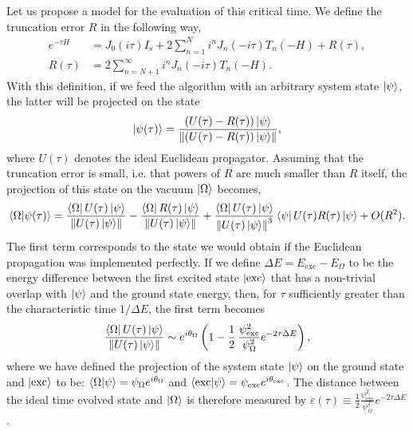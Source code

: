\documentclass[a4paper,11pt]{article}
\begin{document}
Let us propose a model for the evaluation of this critical time. We define the truncation error $R$ in the following way,
\begin{equation}
    \begin{split}
        e^{-\tau H} &=J_0(i\tau)I_s+2\sum_{n=1}^{N} i^n J_n(-i\tau)T_n(-H)+R(\tau),\\
        R(\tau) &= 2\sum_{n=N+1}^{\infty} i^n J_n(-i\tau)T_n(-H).
    \end{split}
\end{equation}
With this definition, if we feed the algorithm with an arbitrary system state $\ket{\psi}$, the latter will be projected on the state
\begin{equation}
    \ket{\psi(\tau)} = \frac{\left(U(\tau) - R(\tau)\right)\ket{\psi}}{\norm{\left(U(\tau) - R(\tau)\right)\ket{\psi}}},
    \label{TruncatedEvolvedState}
\end{equation}
where $U(\tau)$ denotes the ideal Euclidean propagator. Assuming that the truncation error is small, i.e. that powers of $R$ are much smaller than $R$ itself, the projection of this state on the vacuum $\ket{\Omega}$ becomes,
\begin{equation}
    \braket{\Omega}{\psi(\tau)}=\frac{\bra{\Omega}U(\tau)\ket{\psi}}{\norm{U(\tau)\ket{\psi}}} - \frac{\bra{\Omega}R(\tau)\ket{\psi}}{\norm{U(\tau)\ket{\psi}}} +
    \frac{\bra{\Omega}U(\tau)\ket{\psi}}{\norm{U(\tau)\ket{\psi}}^3}
    \bra{\psi}U(\tau)R(\tau)\ket{\psi} + O(R^2).
    \label{Approx1}
\end{equation}
The first term corresponds to the state we would obtain if the Euclidean propagation was implemented perfectly. If we define $\Delta E = E_{\mathrm{exc}}-E_\Omega$ to be the energy difference between the first excited state $\ket{\mathrm{exc}}$ that has a non-trivial overlap with $\ket{\psi}$ and the ground state energy, then, for $\tau$ sufficiently greater than the characteristic time $1/\Delta E$, the first term becomes
\begin{equation}
    \frac{\bra{\Omega}U(\tau)\ket{\psi}}{\norm{U(\tau)\ket{\psi}}} \sim e^{i\theta_\Omega}\left(1-\frac{1}{2}\,\frac{\psi_{\mathrm{exc}}^2}{\psi_\Omega^2}e^{-2\tau\Delta E}\right),
    \label{VacuumApprox}
\end{equation}
where we have defined the projection of the system state $\ket{\psi}$ on the ground state and $\ket{\mathrm{exc}}$ to be: $\braket{\Omega}{\psi} = \psi_\Omega e^{i\theta_\Omega}$ and $\braket{\mathrm{exc}}{\psi} = \psi_\mathrm{exc} e^{i\theta_\mathrm{exc}}$. The distance between the ideal time evolved state and $\ket{\Omega}$ is therefore measured by $\varepsilon(
\tau) \equiv \frac{1}{2}\frac{\psi_{\mathrm{exc}}^2}{\psi_\Omega^2}e^{-2\tau\Delta E}$.
\end{document}
